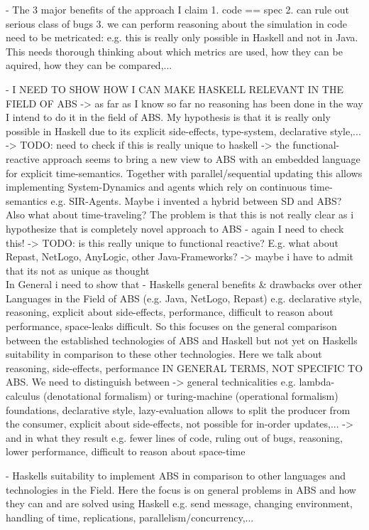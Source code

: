- The 3 major benefits of the approach I claim
	1. code == spec
	2. can rule out serious class of bugs
	3. we can perform reasoning about the simulation in code
	need to be metricated: e.g. this is really only possible in Haskell and not in Java. This needs thorough thinking about which metrics are used, how they can be aquired, how they can be compared,...
	
- I NEED TO SHOW HOW I CAN MAKE HASKELL RELEVANT IN THE FIELD OF ABS
	-> as far as I know so far no reasoning has been done in the way I intend to do it in the field of ABS. My hypothesis is that it is really only possible in Haskell due to its explicit side-effects, type-system, declarative style,... 
		-> TODO: need to check if this is really unique to haskell
	-> the functional-reactive approach seems to bring a new view to ABS with an embedded language for explicit time-semantics. Together with parallel/sequential updating this allows implementing System-Dynamics and agents which rely on continuous time-semantics e.g. SIR-Agents. Maybe i invented a hybrid between SD and ABS? Also what about time-traveling? The problem is that this is not really clear as i hypothesize that is completely novel approach to ABS - again I need to check this!
		-> TODO: is this really unique to functional reactive? E.g. what about Repast, NetLogo, AnyLogic, other Java-Frameworks? 
	-> maybe i have to admit that its not as unique as thought\\
	
In General i need to show that
- Haskells general benefits \& drawbacks over other Languages in the Field of ABS (e.g. Java, NetLogo, Repast) e.g. declarative style, reasoning, explicit about side-effects, performance, difficult to reason about performance, space-leaks difficult. So this focuses on the general comparison between the established technologies of ABS and Haskell but not yet on Haskells suitability in comparison to these other technologies. Here we talk about reasoning, side-effects, performance IN GENERAL TERMS, NOT SPECIFIC TO ABS. We need to distinguish between 
	-> general technicalities e.g. lambda-calculus (denotational formalism) or turing-machine (operational formalism) foundations, declarative style, lazy-evaluation allows to split the producer from the consumer, explicit about side-effects, not possible for in-order updates,...
	-> and in what they result e.g. fewer lines of code, ruling out of bugs, reasoning, lower performance, difficult to reason about space-time 
	
- Haskells suitability to implement ABS in comparison to other languages and technologies in the Field. Here the focus is on general problems in ABS and how they can and are solved using Haskell e.g. send message, changing environment, handling of time, replications, parallelism/concurrency,...

